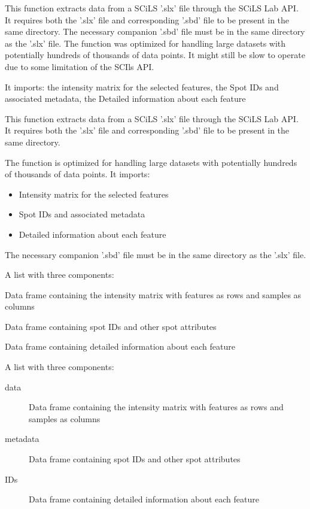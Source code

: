 \documentclass[a4paper]{book}
\begin{document}
\begin{Details}
This function extracts data from a SCiLS '.slx' file through the SCiLS Lab API.
It requires both the '.slx' file and corresponding '.sbd' file to be present in the same directory.
The necessary companion '.sbd' file must be in the same directory as the '.slx' file.
The function was optimized for handling large datasets with potentially hundreds of thousands of
data points. It might still be slow to operate due to some limitation of the SCIls API.

It imports: the intensity matrix for the selected features, the Spot IDs and associated metadata, the Detailed information about each feature

This function extracts data from a SCiLS '.slx' file through the SCiLS Lab API.
It requires both the '.slx' file and corresponding '.sbd' file to be present in the same directory.

The function is optimized for handling large datasets with potentially hundreds of thousands of
data points. It imports:
\begin{itemize}

\item{} Intensity matrix for the selected features
\item{} Spot IDs and associated metadata
\item{} Detailed information about each feature

\end{itemize}


The necessary companion '.sbd' file must be in the same directory as the '.slx' file.
\end{Details}
%
\begin{Value}
A list with three components:
\begin{ldescription}
\item[\code{data}] Data frame containing the intensity matrix with features as rows and samples as columns
\item[\code{metadata}] Data frame containing spot IDs and other spot attributes
\item[\code{IDs}] Data frame containing detailed information about each feature

\end{ldescription}
A list with three components:
\begin{description}

\item[data] Data frame containing the intensity matrix with features as rows and samples as columns
\item[metadata] Data frame containing spot IDs and other spot attributes
\item[IDs] Data frame containing detailed information about each feature

\end{description}

\end{Value}
\end{document}
